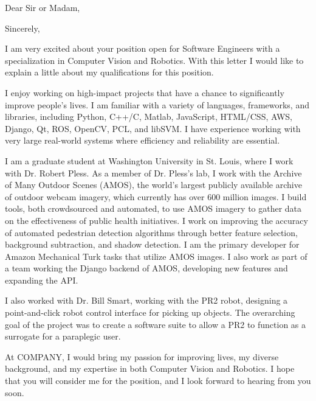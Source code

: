 \documentclass[11pt,a4paper,sans]{moderncv}
\makeatletter
\newcommand{\company}{COMPANY}
\newcommand{\companyaddress}{ADDRESS}
\renewcommand*{\makeletterclosing}{
  \@closing\\[1em]%
  {\large \bfseries \@firstname~\@lastname}%
  \ifthenelse{\isundefined{\@enclosure}}{}{%
    \\%
    \vfill%
    {\color{color2}\itshape\enclname: \@enclosure}}}
\makeatother
\begin{document}
\recipient{\company}{\companyaddress}


\date{January 27, 2015}
\opening{Dear Sir or Madam,} %
\closing{Sincerely,}

\makelettertitle
\vspace{-1em}
\justify
I am very excited about your position open for Software Engineers with a specialization in Computer Vision and Robotics. With this letter I would like to explain a little about my qualifications for this position.
\vspace{1em}

I enjoy working on high-impact projects that have a chance to significantly improve people's lives. I am familiar with a variety of languages, frameworks, and libraries, including Python, C++/C, Matlab, JavaScript, HTML/CSS, AWS, Django, Qt, ROS, OpenCV, PCL, and libSVM.  I have experience working with very large real-world systems where efficiency and reliability are essential.

\vspace{1em}

I am a graduate student at Washington University in St. Louis, where I work with Dr. Robert Pless. As a member of Dr. Pless's lab, I work with the Archive of Many Outdoor Scenes (AMOS), the world's largest publicly available archive of outdoor webcam imagery, which currently has over 600 million images. I build tools, both crowdsourced and automated, to use AMOS imagery to gather data on the effectiveness of public health initiatives. I work on improving the accuracy of automated pedestrian detection algorithms through better feature selection, background subtraction, and shadow detection.  I am the primary developer for Amazon Mechanical Turk tasks that utilize AMOS images. I also work as part of a team working the Django backend of AMOS, developing new features and expanding the API. 

\vspace{1em}

I also worked with Dr. Bill Smart, working with the PR2 robot, designing a point-and-click robot control interface for picking up objects. The overarching goal of the project was to create a software suite to allow a PR2 to function as a surrogate for a paraplegic user. 



\vspace{1em}

At  \company, I would bring my passion for improving lives, my diverse background, and my expertise in both Computer Vision and Robotics. I hope that you will consider me for the position, and I look forward to hearing from you soon.

\vspace{1em}

\makeletterclosing
\end{document}

